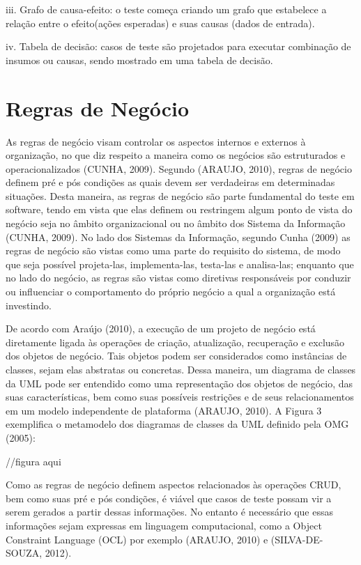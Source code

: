 iii.	Grafo de causa-efeito: o teste começa criando um grafo que estabelece a relação entre o efeito(ações esperadas) e suas causas (dados de entrada). 


iv.	Tabela de decisão: casos de teste são projetados para executar combinação de insumos ou causas, sendo mostrado em uma tabela de decisão. 


\section{Regras de Negócio}


As regras de negócio visam controlar os aspectos internos e externos à organização, no que diz respeito a maneira como os negócios são estruturados e operacionalizados (CUNHA, 2009). Segundo (ARAUJO, 2010), regras de negócio definem pré e pós condições as quais devem ser verdadeiras em determinadas situações. Desta maneira, as regras de negócio são parte fundamental do teste em software, tendo em vista que elas definem ou restringem algum ponto de vista do negócio seja no âmbito organizacional ou no âmbito dos Sistema da Informação (CUNHA, 2009). No lado dos Sistemas da Informação, segundo Cunha (2009) as regras de negócio são vistas como uma parte do requisito do sistema, de modo que seja possível projeta-las, implementa-las, testa-las e analisa-las; enquanto que no lado do negócio, as regras são vistas como diretivas responsáveis por conduzir ou influenciar o comportamento do próprio negócio a qual a organização está investindo.


De acordo com Araújo (2010), a execução de um projeto de negócio está diretamente ligada às operações de criação, atualização, recuperação e exclusão dos objetos de negócio. Tais objetos podem ser considerados como instâncias de classes, sejam elas abstratas ou concretas. Dessa maneira, um diagrama de classes da UML pode ser entendido como uma representação dos objetos de negócio, das suas características, bem como suas possíveis restrições e de seus relacionamentos em um modelo independente de plataforma (ARAUJO, 2010). A Figura 3 exemplifica o metamodelo dos diagramas de classes da UML definido pela OMG (2005):

//figura aqui

Como as regras de negócio definem aspectos relacionados às operações CRUD, bem como suas pré e pós condições, é viável que casos de teste possam vir a serem gerados a partir dessas informações. No entanto é necessário que essas informações sejam expressas em linguagem computacional, como a Object Constraint Language (OCL) por exemplo (ARAUJO, 2010) e (SILVA-DE-SOUZA, 2012).

